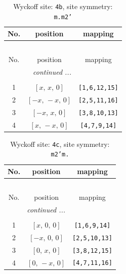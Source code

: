 \documentclass[fleqn,8pt]{jsarticle}
\begin{document}
\begin{longtable}{ccc}
\caption{Wyckoff site: {\tt 4b}, site symmetry: {\tt m.m2'}}
 \\
 \hline \hline
No. & position & mapping \\ \hline \endfirsthead

\multicolumn{2}{l}{\tablename\ \thetable{}} \\
 \hline \hline
No. & position & mapping \\ \hline \endhead

 \hline \hline
\multicolumn{2}{r}{\footnotesize\it continued ...} \\ \endfoot

 \hline \hline
\multicolumn{2}{r}{} \\ \endlastfoot

1 & $\left[ x,\, x,\, 0 \right]$ & {\tt [1,6,12,15]} \\ \hline
2 & $\left[ - x,\, - x,\, 0 \right]$ & {\tt [2,5,11,16]} \\ \hline
3 & $\left[ - x,\, x,\, 0 \right]$ & {\tt [3,8,10,13]} \\ \hline
4 & $\left[ x,\, - x,\, 0 \right]$ & {\tt [4,7,9,14]} \\
\end{longtable}
\renewcommand{\arraystretch}{1.2}
\begin{longtable}{ccc}
\caption{Wyckoff site: {\tt 4c}, site symmetry: {\tt m2'm.}}
 \\
 \hline \hline
No. & position & mapping \\ \hline \endfirsthead

\multicolumn{2}{l}{\tablename\ \thetable{}} \\
 \hline \hline
No. & position & mapping \\ \hline \endhead

 \hline \hline
\multicolumn{2}{r}{\footnotesize\it continued ...} \\ \endfoot

 \hline \hline
\multicolumn{2}{r}{} \\ \endlastfoot

1 & $\left[ x,\, 0,\, 0 \right]$ & {\tt [1,6,9,14]} \\ \hline
2 & $\left[ - x,\, 0,\, 0 \right]$ & {\tt [2,5,10,13]} \\ \hline
3 & $\left[ 0,\, x,\, 0 \right]$ & {\tt [3,8,12,15]} \\ \hline
4 & $\left[ 0,\, - x,\, 0 \right]$ & {\tt [4,7,11,16]} \\
\end{longtable}
\end{document}
